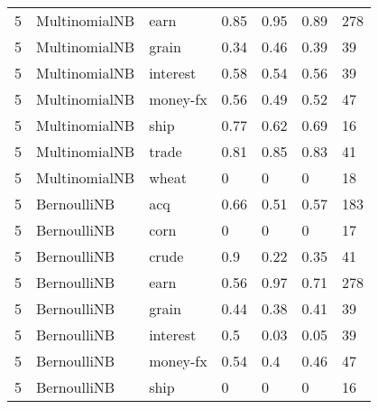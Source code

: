 \documentclass{article}
\begin{document}
\begin{table}[h]
\begin{tabular}{lllllll}
5             & MultinomialNB          & earn            & 0.85               & 0.95            & 0.89              & 278              \\
5             & MultinomialNB          & grain           & 0.34               & 0.46            & 0.39              & 39               \\
5             & MultinomialNB          & interest        & 0.58               & 0.54            & 0.56              & 39               \\
5             & MultinomialNB          & money-fx        & 0.56               & 0.49            & 0.52              & 47               \\
5             & MultinomialNB          & ship            & 0.77               & 0.62            & 0.69              & 16               \\
5             & MultinomialNB          & trade           & 0.81               & 0.85            & 0.83              & 41               \\
5             & MultinomialNB          & wheat           & 0                  & 0               & 0                 & 18               \\
5             & BernoulliNB            & acq             & 0.66               & 0.51            & 0.57              & 183              \\
5             & BernoulliNB            & corn            & 0                  & 0               & 0                 & 17               \\
5             & BernoulliNB            & crude           & 0.9                & 0.22            & 0.35              & 41               \\
5             & BernoulliNB            & earn            & 0.56               & 0.97            & 0.71              & 278              \\
5             & BernoulliNB            & grain           & 0.44               & 0.38            & 0.41              & 39               \\
5             & BernoulliNB            & interest        & 0.5                & 0.03            & 0.05              & 39               \\
5             & BernoulliNB            & money-fx        & 0.54               & 0.4             & 0.46              & 47               \\
5             & BernoulliNB            & ship            & 0                  & 0               & 0                 & 16               \\

\end{tabular}
\end{table}
\end{document}
